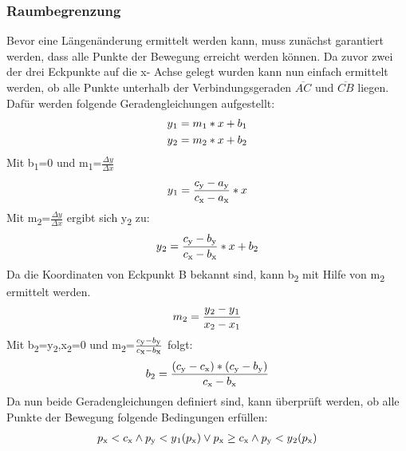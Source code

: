 \documentclass[a4paper, 12pt]{article}
\begin{document}
			\subsubsection{Raumbegrenzung}
			Bevor eine Längenänderung ermittelt werden kann, muss zunächst garantiert werden, dass alle Punkte der Bewegung erreicht werden können. Da zuvor zwei der drei Eckpunkte auf die x- Achse gelegt wurden kann nun einfach ermittelt werden, ob alle Punkte unterhalb der Verbindungsgeraden 
			$\overline {AC}$  
			und 
			$\overline {CB}$
			liegen.
			Dafür werden folgende Geradengleichungen aufgestellt:
			\begin{align}
				y \textsubscript{1} = m \textsubscript{1} * x + b \textsubscript{1}\\
				y \textsubscript{2} = m \textsubscript{2} * x + b \textsubscript{2}
			\end{align}
			Mit b\textsubscript{1}=0 und m\textsubscript{1}=$\frac{\Delta y}{\Delta x}$
			\begin{align}
				y\textsubscript{1} = \frac{c \textsubscript{y}-a \textsubscript{y}}{c \textsubscript{x}-a \textsubscript{x}} * x
			\end{align}
			Mit m\textsubscript{2}=$\frac{\Delta y}{\Delta x}$ ergibt sich y\textsubscript{2} zu:
			\begin{align}
				y\textsubscript{2} = \frac{c\textsubscript{y}-b\textsubscript{y}}{c\textsubscript{x}-b\textsubscript{x}}*x+b\textsubscript{2}
			\end{align}
			Da die Koordinaten von Eckpunkt B bekannt sind, kann b\textsubscript{2} mit Hilfe von m\textsubscript{2} ermittelt werden.
			\begin{align}
				m\textsubscript{2} = \frac{y\textsubscript{2}-y\textsubscript{1}}{x\textsubscript{2}-x\textsubscript{1}}
			\end{align}
			Mit b\textsubscript{2}=y\textsubscript{2},x\textsubscript{2}=0 und m\textsubscript{2}=$\frac{c\textsubscript{y}-b\textsubscript{y}}{c\textsubscript{x}-b\textsubscript{x}}$ folgt:
			\begin{align}
				b\textsubscript{2} = \frac{(c\textsubscript{y}-c\textsubscript{x})*(c\textsubscript{y}-b\textsubscript{y})}{c\textsubscript{x}-b\textsubscript{x}}
			\end{align}
			Da nun beide Geradengleichungen definiert sind, kann überprüft werden, ob alle Punkte der Bewegung folgende Bedingungen erfüllen:
			\begin{align}
						p\textsubscript{x}<c\textsubscript{x} 
				\land 	p\textsubscript{y}<y\textsubscript{1}(p\textsubscript{x}) 
				\lor
						p\textsubscript{x} \geq c\textsubscript{x} 
				\land 	p\textsubscript{y}<y\textsubscript{2}(p\textsubscript{x})
			\end{align}
\end{document}
